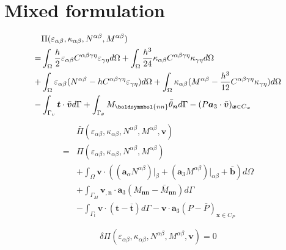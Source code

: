 \section{Mixed formulation}
\begin{equation}
\begin{split}
&\Pi(\varepsilon_{\alpha\beta},\kappa_{\alpha\beta},N^{\alpha\beta},M^{\alpha\beta}) \\
= &\int_\Omega \frac{h}{2}\varepsilon_{\alpha\beta} C^{\alpha\beta\gamma\eta}\varepsilon_{\gamma\eta}d\Omega 
+ \int_\Omega \frac{h^3}{24}\kappa_{\alpha\beta} C^{\alpha\beta\gamma\eta}\kappa_{\gamma\eta}d\Omega \\
+& \int_\Omega \varepsilon_{\alpha\beta} (N^{\alpha\beta} - h C^{\alpha\beta\gamma\eta} \varepsilon_{\gamma\eta}) d\Omega
+ \int_\Omega \kappa_{\alpha\beta} (M^{\alpha\beta} - \frac{h^3}{12} C^{\alpha\beta\gamma\eta} \kappa_{\gamma\eta}) d\Omega \\
-& \int_{\Gamma_v} \boldsymbol t \cdot \bar{\boldsymbol v} d\Gamma 
+ \int_{\Gamma_\theta} M_{\boldsymmbol{nn}} \bar \theta_{\boldsymbol n} d\Gamma - (P \boldsymbol a_3 \cdot \bar{\boldsymbol v})_{\boldsymbol x \in C_w}
\end{split}
\end{equation}
\begin{equation}
\begin{split}
&\bar \Pi(\varepsilon_{\alpha\beta},\kappa_{\alpha\beta},N^{\alpha\beta},M^{\alpha\beta},\boldsymbol v) \\
    =& \Pi(\varepsilon_{\alpha\beta},\kappa_{\alpha\beta},N^{\alpha\beta},M^{\alpha\beta}) \\
    &+ \int_\Omega \boldsymbol v \cdot ((\boldsymbol a_\alpha N^{\alpha\beta})\vert_\beta + (\boldsymbol a_3 M^{\alpha\beta})\vert_{\alpha\beta} + \bar{\boldsymbol b}) d\Omega \\
&+ \int_{\Gamma_M} \boldsymbol v_{,\boldsymbol n} \cdot \boldsymbol a_3 (M_{\boldsymbol{nn}} - \bar M_{\boldsymbol{nn}}) d\Gamma \\
&- \int_{\Gamma_t} \boldsymbol v \cdot (\boldsymbol t - \bar{\boldsymbol t})d\Gamma - \boldsymbol v \cdot \boldsymbol a_3 (P - \bar{P})_{\boldsymbol x \in C_P}
\end{split}
\end{equation}

\begin{equation}
\delta \Pi(\varepsilon_{\alpha\beta},\kappa_{\alpha\beta},N^{\alpha\beta},M^{\alpha\beta},\boldsymbol v) = 0
\end{equation}

